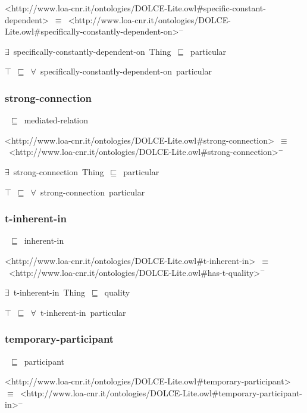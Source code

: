 \documentclass{article}
\begin{document}
<http://www.loa-cnr.it/ontologies/DOLCE-Lite.owl#specific-constant-dependent>~\ensuremath{\equiv}~<http://www.loa-cnr.it/ontologies/DOLCE-Lite.owl#specifically-constantly-dependent-on>\ensuremath{^-}

\ensuremath{\exists}~specifically-constantly-dependent-on~Thing~\ensuremath{\sqsubseteq}~particular

\ensuremath{\top}~\ensuremath{\sqsubseteq}~\ensuremath{\forall}~specifically-constantly-dependent-on~particular

\subsubsection*{strong-connection}

~\ensuremath{\sqsubseteq}~mediated-relation

<http://www.loa-cnr.it/ontologies/DOLCE-Lite.owl#strong-connection>~\ensuremath{\equiv}~<http://www.loa-cnr.it/ontologies/DOLCE-Lite.owl#strong-connection>\ensuremath{^-}

\ensuremath{\exists}~strong-connection~Thing~\ensuremath{\sqsubseteq}~particular

\ensuremath{\top}~\ensuremath{\sqsubseteq}~\ensuremath{\forall}~strong-connection~particular

\subsubsection*{t-inherent-in}

~\ensuremath{\sqsubseteq}~inherent-in

<http://www.loa-cnr.it/ontologies/DOLCE-Lite.owl#t-inherent-in>~\ensuremath{\equiv}~<http://www.loa-cnr.it/ontologies/DOLCE-Lite.owl#has-t-quality>\ensuremath{^-}

\ensuremath{\exists}~t-inherent-in~Thing~\ensuremath{\sqsubseteq}~quality

\ensuremath{\top}~\ensuremath{\sqsubseteq}~\ensuremath{\forall}~t-inherent-in~particular

\subsubsection*{temporary-participant}

~\ensuremath{\sqsubseteq}~participant

<http://www.loa-cnr.it/ontologies/DOLCE-Lite.owl#temporary-participant>~\ensuremath{\equiv}~<http://www.loa-cnr.it/ontologies/DOLCE-Lite.owl#temporary-participant-in>\ensuremath{^-}
\end{document}
